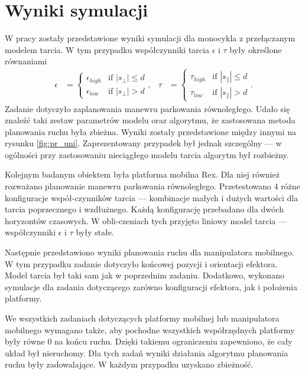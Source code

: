 \section{Wyniki symulacji}
W pracy zostały przedstawione wyniki symulacji dla monocykla z przełączanym modelem tarcia. W tym przypadku współczynniki tarcia $\epsilon$ i $\tau$ były określone równaniami
\begin{equation*}
\begin{aligned}
\epsilon&=\begin{cases}
\epsilon_{high} &\mbox{if } |s_\perp| \leq d \\
\epsilon_{low} &\mbox{if } |s_\perp| > d
\end{cases}, &
\tau&=\begin{cases}
\tau_{high} &\mbox{if } |s_\parallel| \leq d \\
\tau_{low} &\mbox{if } |s_\parallel| > d
\end{cases}.
\end{aligned}
\end{equation*}
Zadanie dotyczyło zaplanowania manewru parkowania równoległego.
Udało się znaleźć taki zestaw parametrów modelu oraz algorytmu, że zastosowana metoda planowania ruchu była zbieżna. Wyniki zostały przedstawione między innymi na rysunku \ref{fig:pr_uni}. Zaprezentowany przypadek był jednak szczególny --- w ogólności przy zastosowaniu nieciągłego modelu tarcia algorytm był rozbieżny.

Kolejnym badanym obiektem była platforma mobilna Rex. Dla niej również rozważano planowanie manewru parkowania równoległego. Przetestowano 4 różne konfiguracje współ-czynników tarcia --- kombinacje małych i dużych wartości dla tarcia poprzecznego i wzdłużnego. Każdą konfigurację przebadano dla dwóch horyzontów czasowych. W obli-czeniach tych przyjęto liniowy model tarcia --- współczynniki $\epsilon$ i $\tau$ były stałe. 

Następnie przedstawiono wyniki planowania ruchu dla manipulatora mobilnego. W tym przypadku zadanie dotyczyło końcowej pozycji i orientacji efektora. Model tarcia był taki sam jak w poprzednim zadaniu. Dodatkowo, wykonano symulacje dla zadania dotyczącego zarówno konfiguracji efektora, jak i położenia platformy.

We wszystkich zadaniach dotyczących platformy mobilnej lub manipulatora mobilnego wymagano także, aby pochodne wszystkich współrzędnych platformy były równe 0 na końcu ruchu. Dzięki takiemu ograniczeniu zapewniono, że cały układ był nieruchomy. Dla tych zadań wyniki działania algorytmu planowania ruchu były zadowalające. W każdym przypadku uzyskano zbieżność. 

